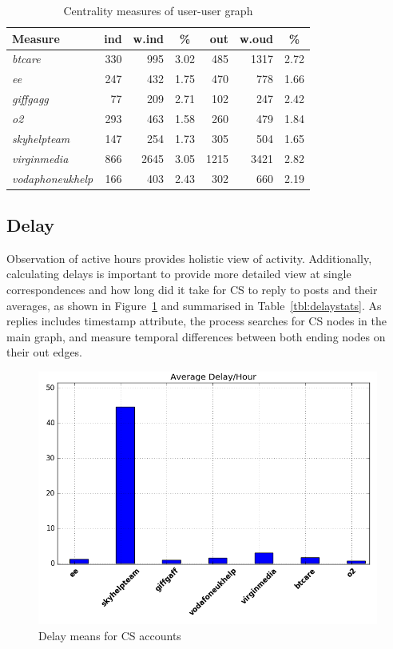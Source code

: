 \documentclass[sigconf]{acmart}
\begin{document}
\begin{table}[!h]
\centering
\begin{tabularx}{\columnwidth}{l|rrc|rrc}
\toprule
\textbf{Measure} & \textbf{ind} & \textbf{w.ind} & \textbf{\%} & \textbf{out} & \textbf{w.oud} & \textbf{\%}\\ 
\midrule
{\emph{btcare}} & 330 & 995 & 3.02 & 485 & 1317 & 2.72\\
{\emph{ee}} & 247 & 432 & 1.75 & 470 & 778 & 1.66 \\
{\emph{giffgagg}} & 77 & 209 & 2.71 & 102 & 247 & 2.42 \\ 
{\emph{o2}} & 293 & 463 & 1.58 & 260 & 479 & 1.84 \\
{\emph{skyhelpteam}} & 147 & 254 & 1.73 & 305 & 504 & 1.65\\
{\emph{virginmedia}} & 866 & 2645 & 3.05 & 1215 & 3421 & 2.82\\
{\emph{vodaphoneukhelp}} & 166 & 403 & 2.43 & 302 & 660 & 2.19\\
\bottomrule
\end{tabularx}
\caption{Centrality measures of user-user graph}
\label{tbl:uucentralitymeasures}
\end{table}

\subsection{Delay}

Observation of active hours provides holistic view of
activity. Additionally, calculating delays is important to provide
more detailed view at single correspondences and how long did it take
for CS to reply to posts and their averages, as shown in
Figure~\ref{fig:delaymeans} and summarised in
Table~\ref{tbl:delaystats}. As replies includes timestamp attribute,
the process searches for CS nodes in the main graph, and measure
temporal differences between both ending nodes on their out edges.

\begin{figure}[htb]
\centering
\includegraphics[width=\columnwidth]{images/delaymeans.png}
\caption{Delay means for CS accounts}
\label{fig:delaymeans}
\end{figure}
\end{document}

